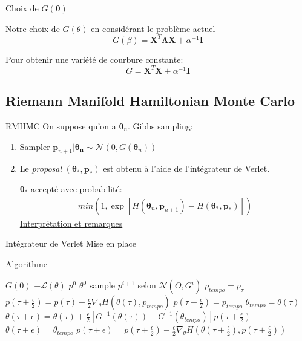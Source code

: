 \documentclass{beamer}
\begin{document}
  \begin{frame}{Choix de $G(\bm{\theta})$}
  
  Notre choix de $G(\theta)$ en consid\'erant le problème actuel 
  $$ G(\beta) = \bm{X}^T\bm{\Lambda X} +\alpha^{-1}\bm{I} $$
  
  Pour obtenir une variété de courbure constante:
  $$ G=\bm{X}^T\bm{X}+\alpha^{-1}\bm{I} $$
  
  \end{frame}

  
  
  \subsection{Riemann Manifold Hamiltonian Monte Carlo}
  
  \begin{frame}{RMHMC}
  On suppose qu'on a $\bm{\theta}_n$. Gibbs sampling:
  \begin{enumerate}
    \item Sampler $\bm{p}_{n+1}|\bm{\theta_n} \sim \mathcal{N}(0, G(\bm{\theta}_n))$
    \item Le \textit{proposal} $(\bm{\theta}_{*}, \bm{p}_*)$ est obtenu à l'aide de l'intégrateur de Verlet.
    
    $\bm{\theta}_{*}$ accepté avec probabilité: 
    \begin{align*}
    min(1, \exp[H(\bm{\theta}_n, \bm{p}_{n+1}) 
    - H(\bm{\theta}_*, \bm{p}_*)])
    \end{align*}
    \underline{Interprétation et remarques}
  \end{enumerate}
  \end{frame}  
  
  \begin{frame}{Intégrateur de Verlet}
	Mise en place	
	
  \end{frame}	  
      
  
  \begin{frame}{Algorithme}
  

\begin{algorithmic}
\REQUIRE $G(0)$ $-\mathcal{L}(\theta)$ $p^0$ $\theta^0$
{}
\STATE sample $p^{i+1}$ selon $\mathcal{N}(O,G^i)$
\STATE $p_{tempo}=p_\tau$
\STATE $p\left(\tau +\frac{\epsilon}{2}\right)=p\left(\tau\right)-\frac{\epsilon}{2}\nabla_\theta H\left(\theta(\tau),p_{tempo}\right)$
\ENDFOR
\STATE $p\left(\tau +\frac{\epsilon}{2}\right) =p_{tempo}$
\STATE $\theta_{tempo}=\theta(\tau)$
\STATE $\theta(\tau +\epsilon)=\theta(\tau)+\frac{\epsilon}{2}\left[G^{-1}\left(\theta(\tau)\right)+G^{-1}\left(\theta_{tempo}\right)\right]p\left(\tau+\frac{\epsilon}{2}\right)$
\ENDFOR
\STATE $\theta(\tau+\epsilon)=\theta_{tempo}$
\STATE $p(\tau+\epsilon)=p\left(\tau+\frac{\epsilon}{2}\right)-\frac{\epsilon}{2}\nabla_\theta H\left(\theta\left(\tau+\frac{\epsilon}{2}\right),p\left(\tau+\frac{\epsilon}{2}\right)\right)$
\ENDFOR
\ENDFOR
\end{algorithmic}

  \end{frame}
  
\end{document}
